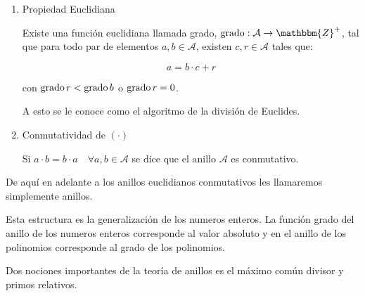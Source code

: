 \begin{definicion}
\begin{enumerate}
                \item Propiedad Euclidiana

                Existe una función euclidiana llamada grado, $\grado : \mathcal{A} \to \mathbbm{Z}^+$, tal que para todo par de elementos $a, b \in \mathcal{A}$, existen $c, r \in \mathcal{A}$ tales que:

                \begin{equation*}
                    a = b \cdot c + r
                \end{equation*}

                con $\operatorname{grado}{r} < \operatorname{grado}{b}$ o $\operatorname{grado}{r} = 0$.

                A esto se le conoce como el algoritmo de la división de Euclides.
                \item Conmutatividad de $(\cdot)$

                Si $a \cdot b = b \cdot a \quad \forall a, b \in \mathcal{A}$ se dice que el anillo $\mathcal{A}$ es conmutativo.
            \end{enumerate}

            De aquí en adelante a los anillos euclidianos conmutativos les llamaremos simplemente anillos.

            Esta estructura es la generalización de los numeros enteros. La función grado del anillo de los numeros enteros corresponde al valor absoluto y en el anillo de los polinomios corresponde al grado de los polinomios.
        \end{definicion}

        Dos nociones importantes de la teoría de anillos es el máximo común divisor y primos relativos.

